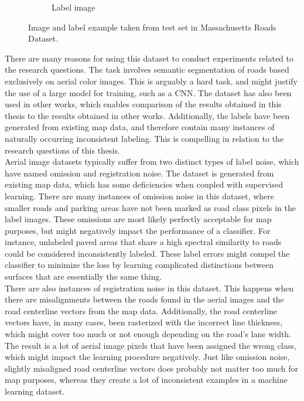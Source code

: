 \begin{figure}
\begin{subfigure}{0.48\textwidth}
\caption{Label image} \label{fig:mass_roads_example_label}
\end{subfigure}
\hspace*{\fill} %
\caption[Massachusetts Roads Dataset]{Image and label example taken from test set in Massachusetts Roads Dataset.} \label{fig:mass_roads_example}
\end{figure}


There are many reasons for using this dataset to conduct experiments related to the research questions.  The task involves semantic segmentation of roads based exclusively on aerial color images. This is arguably a hard task, and might justify the use of a large model for training, such as a \ac{CNN}. The dataset has also been used in other works, which enables comparison of the results obtained in this thesis to the results obtained in other works. Additionally, the labels have been generated from existing map data, and therefore contain many instances of naturally occurring inconsistent labeling. This is compelling in relation to the research questions of this thesis.\\

Aerial image datasets typically suffer from two distinct types of label noise, which \cite{Mnih_aerial_images_noisy} have named omission and registration noise. The dataset is generated from existing map data, which has  some deficiencies when coupled with supervised learning. There are many instances of omission noise in this dataset, where smaller roads and parking areas have not been marked as road class pixels in the label images. These omissions are most likely perfectly acceptable for map purposes, but might negatively impact the performance of a classifier.  For instance, unlabeled paved areas that share a high spectral similarity to roads could be considered inconsistently labeled. These label errors might compel the classifier to minimize the loss by learning complicated distinctions between surfaces that are essentially the same thing.\\

There are also instances of registration noise in this dataset. This happens when there are misalignments between the roads found in the aerial images and the road centerline vectors from the map data. Additionally, the road centerline vectors have, in many cases, been rasterized with the incorrect line thickness, which might cover too much or not enough depending on the road's lane width. The result is a lot of aerial image pixels that have been assigned the wrong class, which might impact the learning procedure negatively. Just like omission noise, slightly misaligned road centerline vectors does  probably not matter too much for map purposes, whereas they create a lot of inconsistent examples in a machine learning dataset.


